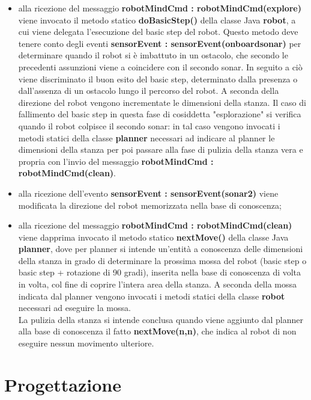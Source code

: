\documentclass{llncs}
\newcommand{\labelsec}[1]{\label{sec:#1}}
\begin{document}
\begin{itemize}
	\item alla ricezione del messaggio \textbf{robotMindCmd : robotMindCmd(explore)} viene invocato il metodo statico \textbf{doBasicStep()} della classe Java \textbf{robot}, a cui viene delegata l'esecuzione del basic step del robot. Questo metodo deve tenere conto degli eventi \textbf{sensorEvent : sensorEvent(onboardsonar)} per determinare quando il robot si è imbattuto in un ostacolo, che secondo le precedenti assunzioni viene a coincidere con il secondo sonar. In seguito a ciò viene discriminato il buon esito del basic step, determinato dalla presenza o dall'assenza di un ostacolo lungo il percorso del robot. A seconda della direzione del robot vengono incrementate le dimensioni della stanza. Il caso di fallimento del basic step in questa fase di cosiddetta "esplorazione" si verifica quando il robot colpisce il secondo sonar: in tal caso vengono invocati i metodi statici della classe \textbf{planner} necessari ad indicare al planner le dimensioni della stanza per poi passare alla fase di pulizia della stanza vera e propria con l'invio del messaggio \textbf{robotMindCmd : robotMindCmd(clean)}.
	\item alla ricezione dell'evento \textbf{sensorEvent : sensorEvent(sonar2)} viene modificata la direzione del robot memorizzata nella base di conoscenza;
	\item alla ricezione del messaggio \textbf{robotMindCmd : robotMindCmd(clean)} viene dapprima invocato il metodo statico \textbf{nextMove()} della classe Java \textbf{planner}, dove per planner si intende un'entità a conoscenza delle dimensioni della stanza in grado di determinare la prossima mossa del robot (basic step o basic step + rotazione di 90 gradi), inserita nella base di conoscenza di volta in volta, col fine di coprire l'intera area della stanza. A seconda della mossa indicata dal planner vengono invocati i metodi statici della classe \textbf{robot} necessari ad eseguire la mossa. \\ La pulizia della stanza si intende conclusa quando viene aggiunto dal planner alla base di conoscenza il fatto \textbf{nextMove(n,n)}, che indica al robot di non eseguire nessun movimento ulteriore. 
\end{itemize}


\section{Progettazione}
\labelsec{Project}
\end{document}
